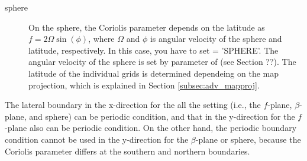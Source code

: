 \begin{description}
\item[sphere]
  On the sphere, the Coriolis parameter depends on the latitude as $f = 2\Omega \sin(\phi)$, where $\Omega$ and $\phi$ is angular velocity of the sphere and latitude, respectively.
  In this case, you have to set  = 'SPHERE'.
  The angular velocity of the sphere is set by  parameter of  (see Section ??).
  The latitude of the individual grids is determined dependeing on the map projection, which is explained in Section \ref{subsec:adv_mapproj}.


\end{description}

The lateral boundary in the x-direction for the all the setting (i.e., the $f$-plane, $\beta$-plane, and sphere) can be periodic condition, and that in the y-direction for the $f$-plane also can be periodic condition.
On the other hand, the periodic boundary condition cannot be used in the y-direction for the $\beta$-plane or sphere, because the Coriolis parameter differs at the southern and northern boundaries.
